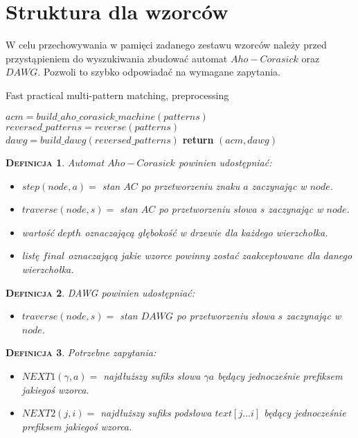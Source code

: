 \documentclass[a4paper,11pt]{article}
\newtheorem{DEF}{\textsc{Definicja}}[section]
\begin{document}
\section{Struktura dla wzorców}
W celu przechowywania w pamięci zadanego zestawu wzorców należy przed przystąpieniem do wyszukiwania zbudować automat $Aho-Corasick$ oraz $DAWG$. Pozwoli to szybko odpowiadać na wymagane zapytania.

\begin{algorithm}
\caption{Fast practical multi-pattern matching, preprocessing}
\begin{algorithmic}[1]
 
\State $acm = build\_aho\_corasick\_machine(patterns)$ 
\State $reversed\_patterns = reverse(patterns)$ 
\State $dawg = build\_dawg(reversed\_patterns)$ 
\State \textbf{return} $(acm, dawg)$ 
\EndProcedure
\end{algorithmic}
\end{algorithm}

\newpage

\begin{DEF}
Automat $Aho-Corasick$  powinien udostępniać:
\begin{itemize}
    \item $step(node, a) = $ stan $AC$ po przetworzeniu znaku $a$ zaczynając w $node$.
    \item $traverse(node, s) = $ stan $AC$ po przetworzeniu słowa $s$ zaczynając w $node$.
    \item wartość $depth$ oznaczającą głębokość w drzewie dla każdego wierzchołka.
    \item listę $final$ oznaczającą jakie wzorce powinny zostać zaakceptowane dla danego wierzchołka.

\end{itemize}
\end{DEF}

\begin{DEF}
DAWG powinien udostępniać:
\begin{itemize}
    \item $traverse(node, s) = $ stan $DAWG$ po przetworzeniu słowa $s$ zaczynając w $node$.
\end{itemize}
\end{DEF}

\begin{DEF}
Potrzebne zapytania:
\begin{itemize}
    \item $NEXT1(\gamma, a) = $ najdłuższy sufiks słowa ${\gamma}{a}$ będący jednocześnie prefiksem jakiegoś wzorca.
    \item $NEXT2(j, i) = $ najdłuższy sufiks podsłowa ${text[j...i]}$ będący jednocześnie prefiksem jakiegoś wzorca.
\end{itemize}
\end{DEF}
\end{document}
